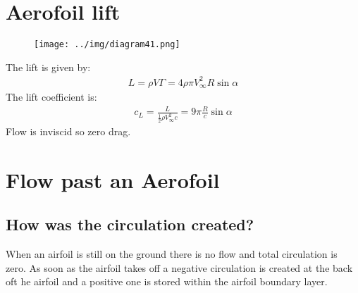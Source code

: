 \documentclass[class=report, crop=false, 12pt,a4paper]{standalone}
\begin{document}
\section{Aerofoil lift}
\begin{figure}[H]
  \centering
  \texttt{[image: ../img/diagram41.png]}
\end{figure}
The lift is given by:
\begin{align}
  L = \rho V \Gamma = 4 \rho \pi V_\infty^2 R \sin{\alpha}
\end{align}
The lift coefficient is:
\begin{align}
  c_L = \frac{L}{\frac{1}{2}\rho V_\infty^2 c} = 9\pi \frac{R}{c}\sin{\alpha}
\end{align}
Flow is inviscid so zero drag.
\section{Flow past an Aerofoil}
\subsection{How was the circulation created?}
When an airfoil is still on the ground there is no flow and total circulation is zero. As soon as the airfoil takes off a negative circulation is created at the back oft he airfoil and a positive one is stored within the airfoil boundary layer.
\end{document}
